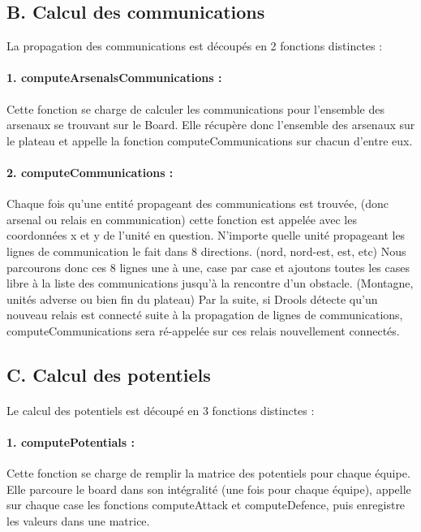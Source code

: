 \documentclass[12pt]{article}
\begin{document}
		\subsection{B. Calcul des communications}
		
		La propagation des communications est découpés en 2 fonctions distinctes :
		
		\paragraph{1. computeArsenalsCommunications : }
		Cette fonction se charge de calculer les communications pour l'ensemble des arsenaux se trouvant sur le Board.
		Elle récupère donc l'ensemble des arsenaux sur le plateau et appelle la fonction computeCommunications sur chacun d'entre eux.
		
		\paragraph{2. computeCommunications : }
		Chaque fois qu'une entité propageant des communications est trouvée, (donc arsenal ou relais en communication) cette fonction est appelée
		avec les coordonnées x et y de l'unité en question.
		N'importe quelle unité propageant les lignes de communication le fait dans 8 directions. (nord, nord-est, est, etc)
		Nous parcourons donc ces 8 lignes une à une, case par case et ajoutons toutes les cases libre à la liste des communications jusqu'à
		la rencontre d'un obstacle. (Montagne, unités adverse ou bien fin du plateau)
		Par la suite, si Drools détecte qu'un nouveau relais est connecté suite à la propagation de lignes de communications, computeCommunications
		sera ré-appelée sur ces relais nouvellement connectés.
		
		\subsection{C. Calcul des potentiels}
		
		\paragraph{}
		Le calcul des potentiels est découpé en 3 fonctions distinctes :
		
		\paragraph{1. computePotentials : }
		Cette fonction se charge de remplir la matrice des potentiels pour chaque équipe.
		Elle parcoure le board dans son intégralité (une fois pour chaque équipe), appelle sur chaque case les fonctions computeAttack et 
		computeDefence, puis enregistre les valeurs dans une matrice.
		
\end{document}
